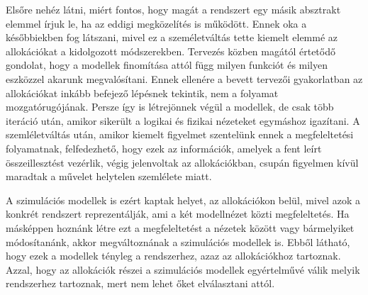         Elsőre nehéz látni, miért fontos, hogy magát a rendszert egy másik absztrakt elemmel írjuk le, ha az eddigi megközelítés is működött. Ennek oka a későbbiekben fog látszani, mivel ez a személetváltás tette kiemelt elemmé az allokációkat a kidolgozott módszerekben.
        Tervezés közben magától értetődő gondolat, hogy a modellek finomítása attól függ milyen funkciót és milyen eszközzel akarunk megvalósítani.
        Ennek ellenére a bevett tervezői gyakorlatban az allokációkat inkább befejező lépésnek tekintik, nem a folyamat mozgatórugójának. Persze így is létrejönnek végül a modellek, de csak több iteráció után, amikor sikerült a logikai és fizikai nézeteket egymáshoz igazítani.
        A szemléletváltás után, amikor kiemelt figyelmet szentelünk ennek a megfeleltetési folyamatnak, felfedezhető, hogy ezek az információk, amelyek a fent leírt összeillesztést vezérlik, végig jelenvoltak az allokációkban, csupán figyelmen kívül maradtak a művelet helytelen szemlélete miatt.

        A szimulációs modellek is ezért kaptak helyet, az allokációkon belül, mivel azok a konkrét rendszert reprezentálják, ami a két modellnézet közti megfeleltetés.
        Ha másképpen hoznánk létre ezt a megfeleltetést a nézetek között vagy bármelyiket módosítanánk, akkor megváltoznának a szimulációs modellek is. Ebből látható, hogy ezek a modellek tényleg a rendszerhez, azaz az allokációkhoz tartoznak. Azzal, hogy az allokációk részei a szimulációs modellek egyértelművé válik melyik rendszerhez tartoznak, mert nem lehet őket elválasztani attól.

